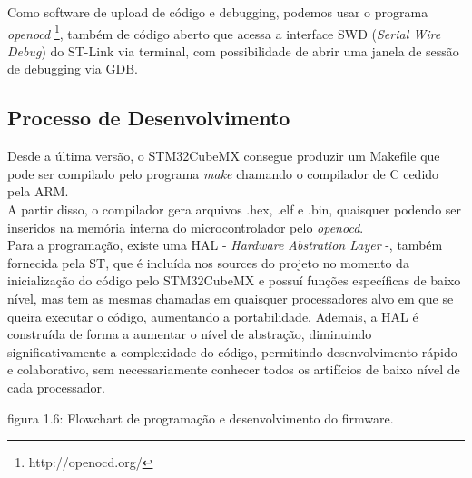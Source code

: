 \documentclass[11pt,a4paper]{report}
\begin{document}
	Como software de upload de código e debugging, podemos usar o programa {\it openocd} \footnote{http://openocd.org/}, também de código aberto que acessa a interface SWD ({\it Serial Wire Debug}) do ST-Link via terminal, com possibilidade de abrir uma janela de sessão de debugging via GDB.
	
	\subsection{Processo de Desenvolvimento}
	Desde a última versão, o STM32CubeMX consegue produzir um Makefile que pode ser compilado pelo programa {\it make} chamando o compilador de C cedido pela ARM.\\
	
	A partir disso, o compilador gera arquivos .hex, .elf e .bin, quaisquer podendo ser inseridos na memória interna do microcontrolador pelo {\it openocd}.\\
	
	Para a programação, existe uma HAL - {\it Hardware Abstration Layer} -, também fornecida pela ST, que é incluída nos sources do projeto no momento da inicialização do código pelo STM32CubeMX e possuí funções específicas de baixo nível, mas tem as mesmas chamadas em quaisquer processadores alvo em que se queira executar o código, aumentando a portabilidade. Ademais, a HAL é construída de forma a aumentar o nível de abstração, diminuindo significativamente a complexidade do código, permitindo desenvolvimento rápido e colaborativo, sem necessariamente conhecer todos os artifícios de baixo nível de cada processador.
	\begin{center}
		\vspace{0.1cm}
	\footnotesize{figura 1.6: Flowchart de programação e desenvolvimento do firmware.}
	\end{center}
\end{document}
